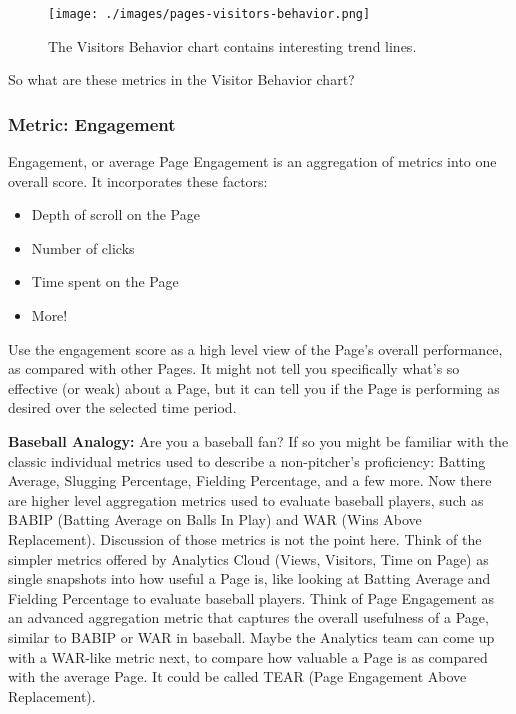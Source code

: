 \begin{figure}
\centering
\texttt{[image: ./images/pages-visitors-behavior.png]}
\caption{The Visitors Behavior chart contains interesting trend lines.}
\end{figure}

So what are these metrics in the Visitor Behavior chart?

\subsubsection{Metric: Engagement}\label{metric-engagement}

Engagement, or average Page Engagement is an aggregation of metrics into
one overall score. It incorporates these factors:

\begin{itemize}
\tightlist
\item
  Depth of scroll on the Page
\item
  Number of clicks
\item
  Time spent on the Page
\item
  More!
\end{itemize}

Use the engagement score as a high level view of the Page's overall
performance, as compared with other Pages. It might not tell you
specifically what's so effective (or weak) about a Page, but it can tell
you if the Page is performing as desired over the selected time period.

\textbf{Baseball Analogy:} Are you a baseball fan? If so you might be
familiar with the classic individual metrics used to describe a
non-pitcher's proficiency: Batting Average, Slugging Percentage,
Fielding Percentage, and a few more. Now there are higher level
aggregation metrics used to evaluate baseball players, such as BABIP
(Batting Average on Balls In Play) and WAR (Wins Above Replacement).
Discussion of those metrics is not the point here. Think of the simpler
metrics offered by Analytics Cloud (Views, Visitors, Time on Page) as
single snapshots into how useful a Page is, like looking at Batting
Average and Fielding Percentage to evaluate baseball players. Think of
Page Engagement as an advanced aggregation metric that captures the
overall usefulness of a Page, similar to BABIP or WAR in baseball. Maybe
the Analytics team can come up with a WAR-like metric next, to compare
how valuable a Page is as compared with the average Page. It could be
called TEAR (Page Engagement Above Replacement).


